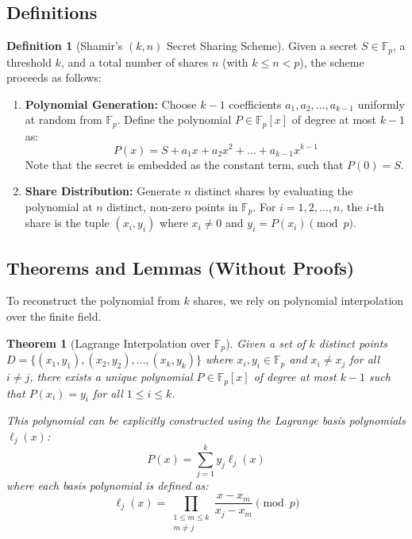\documentclass[12pt]{article}
\theoremstyle{definition}
\newtheorem{definition}{Definition}
\theoremstyle{plain}
\newtheorem{theorem}{Theorem}
\begin{document}
	\subsection{Definitions}
	
	\begin{definition}[Shamir's $(k, n)$ Secret Sharing Scheme]
		Given a secret $S \in \mathbb{F}_p$, a threshold $k$, and a total number of shares $n$ (with $k \le n < p$), the scheme proceeds as follows:
		\begin{enumerate}
			\item \textbf{Polynomial Generation:} Choose $k-1$ coefficients $a_1, a_2, \dots, a_{k-1}$ uniformly at random from $\mathbb{F}_p$. Define the polynomial $P \in \mathbb{F}_p[x]$ of degree at most $k-1$ as:
			$$ P(x) = S + a_1 x + a_2 x^2 + \dots + a_{k-1} x^{k-1} $$
			Note that the secret is embedded as the constant term, such that $P(0) = S$.
			\item \textbf{Share Distribution:} Generate $n$ distinct shares by evaluating the polynomial at $n$ distinct, non-zero points in $\mathbb{F}_p$. For $i = 1, 2, \dots, n$, the $i$-th share is the tuple $(x_i, y_i)$ where $x_i \neq 0$ and $y_i = P(x_i) \pmod p$.
		\end{enumerate}
	\end{definition}
	
	\subsection{Theorems and Lemmas (Without Proofs)}
	
	To reconstruct the polynomial from $k$ shares, we rely on polynomial interpolation over the finite field.
	
	\begin{theorem}[Lagrange Interpolation over $\mathbb{F}_p$]
		Given a set of $k$ distinct points $D = \{(x_1, y_1), (x_2, y_2), \dots, (x_k, y_k)\}$ where $x_i, y_i \in \mathbb{F}_p$ and $x_i \neq x_j$ for all $i \neq j$, there exists a unique polynomial $P \in \mathbb{F}_p[x]$ of degree at most $k-1$ such that $P(x_i) = y_i$ for all $1 \le i \le k$. 
		
		This polynomial can be explicitly constructed using the Lagrange basis polynomials $\ell_j(x)$:
		$$ P(x) = \sum_{j=1}^{k} y_j \ell_j(x) $$
		where each basis polynomial is defined as:
		$$ \ell_j(x) = \prod_{\substack{1 \le m \le k \\ m \neq j}} \frac{x - x_m}{x_j - x_m} \pmod p $$
	\end{theorem}
	
\end{document}
